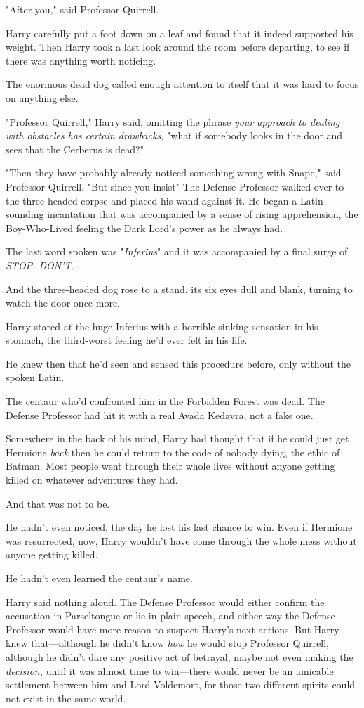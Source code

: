 "After you," said Professor Quirrell.

Harry carefully put a foot down on a leaf and found that it indeed supported
his weight. Then Harry took a last look around the room before departing, to
see if there was anything worth noticing.

The enormous dead dog called enough attention to itself that it was hard to
focus on anything else.

"Professor Quirrell," Harry said, omitting the phrase \emph{your approach to
dealing with obstacles has certain drawbacks,} "what if somebody looks in the
door and sees that the Cerberus is dead?"

"Then they have probably already noticed something wrong with Snape," said
Professor Quirrell. "But since you insist{\el}" The Defense Professor walked
over to the three-headed corpse and placed his wand against it. He began a
Latin-sounding incantation that was accompanied by a sense of rising
apprehension, the Boy-Who-Lived feeling the Dark Lord's power as he always had.

The last word spoken was "\emph{Inferius}" and it was accompanied by a final
surge of \emph{STOP, DON'T}.

And the three-headed dog rose to a stand, its six eyes dull and blank, turning
to watch the door once more.

Harry stared at the huge Inferius with a horrible sinking sensation in his
stomach, the third-worst feeling he'd ever felt in his life.

He knew then that he'd seen and sensed this procedure before, only without the
spoken Latin.

The centaur who'd confronted him in the Forbidden Forest was dead. The Defense
Professor had hit it with a real Avada Kedavra, not a fake one.

Somewhere in the back of his mind, Harry had thought that if he could just get
Hermione \emph{back} then he could return to the code of nobody dying, the
ethic of Batman. Most people went through their whole lives without anyone
getting killed on whatever adventures they had.

And that was not to be.

He hadn't even noticed, the day he lost his last chance to win. Even if
Hermione was resurrected, now, Harry wouldn't have come through the whole mess
without anyone getting killed.

He hadn't even learned the centaur's name.

Harry said nothing aloud. The Defense Professor would either confirm the
accusation in Parseltongue or lie in plain speech, and either way the Defense
Professor would have more reason to suspect Harry's next actions. But Harry
knew that—although he didn't know \emph{how} he would stop Professor
Quirrell, although he didn't dare any positive act of betrayal, maybe not even
making the \emph{decision,} until it was almost time to win—there would never
be an amicable settlement between him and Lord Voldemort, for those two
different spirits could not exist in the same world.

